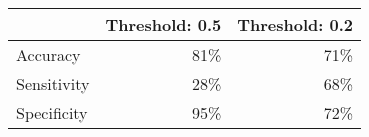 \begin{tabular}{lrr}
\toprule
      & \multicolumn{1}{l}{Threshold: 0.5} & \multicolumn{1}{l}{Threshold: 0.2} \\
\midrule
Accuracy	 	& 81\%	& 71\% \\
Sensitivity 	& 28\%	& 68\% \\
Specificity 	& 95\%	& 72\% \\
\bottomrule
\end{tabular}%





